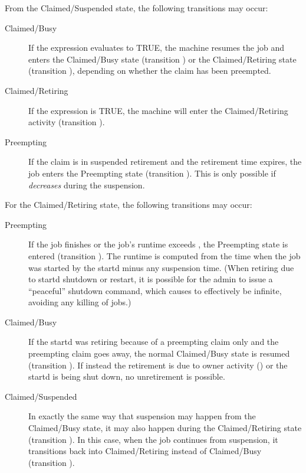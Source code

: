 From the Claimed/Suspended state, the following transitions
may occur:

\begin{description}
  
\item[Claimed/Busy] If the  expression evaluates to
  TRUE, the machine resumes the job and enters the
  Claimed/Busy state (transition ) or the Claimed/Retiring
  state (transition ), depending on whether the claim
  has been preempted.

\item[Claimed/Retiring] If the  expression is TRUE, the machine
  will enter the Claimed/Retiring activity (transition ).

\item[Preempting] If the claim is in suspended retirement and the
  retirement time expires, the job enters the Preempting state
  (transition ).  This is only possible if
   \emph{decreases}  during the suspension.

\end{description}

For the Claimed/Retiring state, the following transitions may occur:

\begin{description}

\item[Preempting] If the job finishes or the job's runtime exceeds
, the Preempting state is entered
(transition ).  The runtime is computed from the time when the
job was started by the startd minus any suspension time.  (When retiring
due to startd shutdown or restart, it is possible for the admin to issue a
``peaceful'' shutdown command, which causes 
to effectively be infinite, avoiding any killing of jobs.)

\item[Claimed/Busy] If the startd was retiring because of a preempting
claim only and the preempting claim goes away, the normal Claimed/Busy
state is resumed (transition ).  If instead the retirement
is due to owner activity () or the startd is being shut down,
no unretirement is possible.

\item[Claimed/Suspended] In exactly the same way that suspension may
happen from the Claimed/Busy state, it may also happen during the
Claimed/Retiring state (transition ).  In this case, when the
job continues from suspension, it transitions back into
Claimed/Retiring instead of Claimed/Busy (transition ).

\end{description}

